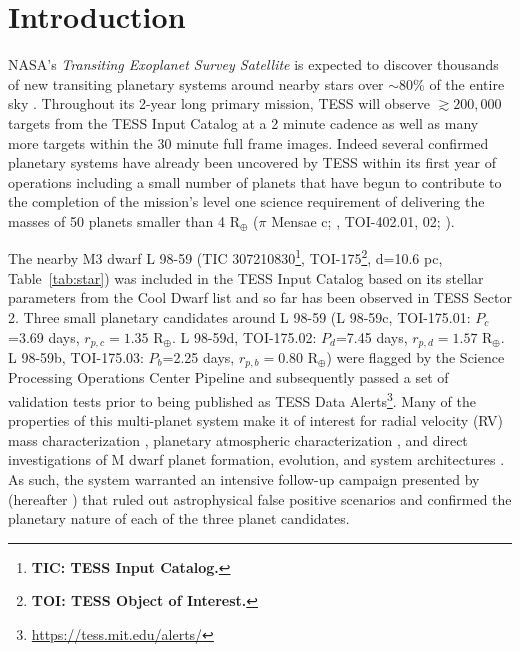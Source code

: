 \documentclass[longauth]{aa}
\begin{document}
\section{Introduction}
NASA's \emph{Transiting Exoplanet Survey Satellite} \citep[TESS;][]{ricker15} is expected to discover thousands of new transiting planetary systems around nearby stars over $\sim 80$\% of the entire sky \citep{sullivan15,ballard19,barclay18,huang18b}. Throughout its 2-year long primary mission, TESS will observe $\gtrsim 200,000$ targets from the TESS Input Catalog \citep[TIC;][]{stassun17} at a 2 minute cadence as well as many more targets within the 30 minute full frame images. Indeed several confirmed planetary systems have already been uncovered by TESS within its first year of operations \citep{brahm18,jones18,canas19,dragomir19,espinoza19,kipping19,kostov19,neilsen19,quinn19,rodriguez19,wang19,vanderspek19} including a small number of planets that have begun to contribute to the completion of the mission's level one science requirement of delivering the masses of 50 planets smaller than 4 R$_{\oplus}$ ($\pi$ Mensae c; \citealt{gandolfi18,huang18a}, TOI-402.01, 02; \citealt{dumusque19}).

The nearby M3 dwarf L 98-59 (TIC 307210830\footnote{\textbf{TIC: TESS Input Catalog.}}, TOI-175\footnote{\textbf{TOI: TESS Object of Interest.}}, d=10.6 pc, Table~\ref{tab:star}) was included in the TESS Input Catalog based on its stellar parameters from the Cool Dwarf list \citep{muirhead18} and so far has been observed in TESS Sector 2. Three small planetary candidates around L 98-59 (L 98-59c, TOI-175.01: $P_c$=3.69 days, $r_{p,c}=1.35$ R$_{\oplus}$. L 98-59d, TOI-175.02: $P_d$=7.45 days, $r_{p,d}=1.57$ R$_{\oplus}$. L 98-59b, TOI-175.03: $P_b$=2.25 days, $r_{p,b}=0.80$ R$_{\oplus}$) were flagged by the Science Processing Operations Center Pipeline \citep[SPOC;][]{jenkins16} and subsequently passed a set of validation tests \citep{twicken18,li19} prior to being published as TESS Data Alerts\footnote{\url{https://tess.mit.edu/alerts/}}. Many of the properties of this multi-planet system make it of interest for radial velocity (RV) mass characterization \citep{cloutier18b}, planetary atmospheric characterization \citep{kempton18,louie18}, and direct investigations of M dwarf planet formation, evolution, and system architectures \citep{lissauer11,fabrycky14}. As such, the system warranted an intensive follow-up campaign presented by  \citealt{kostov19} (hereafter ) that ruled out astrophysical false positive scenarios and confirmed the planetary nature of each of the three planet candidates. 
\end{document}
